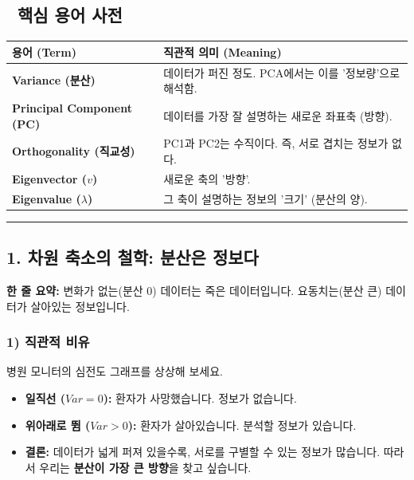 \documentclass[11pt,a4paper]{book}
\theoremstyle{definition}
\begin{document}
\subsection*{📝 핵심 용어 사전}
\begin{table}[h]
\centering
\begin{tabularx}{\textwidth}{|p{}|X|}
\hline
\textbf{용어 (Term)} & \textbf{직관적 의미 (Meaning)} \\
\hline
\textbf{Variance (분산)} & 데이터가 퍼진 정도. PCA에서는 이를 '정보량'으로 해석함. \\
\hline
\textbf{Principal Component (PC)} & 데이터를 가장 잘 설명하는 새로운 좌표축 (방향). \\
\hline
\textbf{Orthogonality (직교성)} & PC1과 PC2는 수직이다. 즉, 서로 겹치는 정보가 없다. \\
\hline
\textbf{Eigenvector ($v$)} & 새로운 축의 '방향'. \\
\hline
\textbf{Eigenvalue ($\lambda$)} & 그 축이 설명하는 정보의 '크기' (분산의 양). \\
\hline
\end{tabularx}
\end{table}

\vspace{0.5cm}\hrule\vspace{0.5cm}

\subsection{1. 차원 축소의 철학: 분산은 정보다}

\begin{conceptbox}[title={개념 1: 심장 박동기 모니터}]
\textbf{한 줄 요약:} 변화가 없는(분산 0) 데이터는 죽은 데이터입니다. 요동치는(분산 큰) 데이터가 살아있는 정보입니다.
\end{conceptbox}

\subsubsection*{1) 직관적 비유}
병원 모니터의 심전도 그래프를 상상해 보세요.
\begin{itemize}
    \item \textbf{일직선 ($Var=0$):} 환자가 사망했습니다. 정보가 없습니다.
    \item \textbf{위아래로 뜀 ($Var > 0$):} 환자가 살아있습니다. 분석할 정보가 있습니다.
    \item \textbf{결론:} 데이터가 넓게 퍼져 있을수록, 서로를 구별할 수 있는 정보가 많습니다. 따라서 우리는 \textbf{분산이 가장 큰 방향}을 찾고 싶습니다.
\end{itemize}
\end{document}
